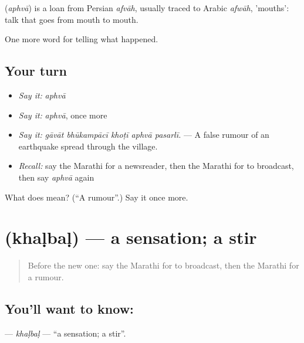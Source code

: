 \begin{cousinweb}
\textbf{} (\emph{aphvā}) is a loan from Persian \emph{afvāh}, usually traced to Arabic \emph{afwāh}, 'mouths': talk that goes from mouth to mouth.
\end{cousinweb}

\begin{grammarlens}[title={What you've built}]
One more word for telling what happened.
\end{grammarlens}

\subsection*{Your turn}
\begin{itemize}
\raggedright
  \item \emph{Say it:} \emph{aphvā}
  \item \emph{Say it:} \emph{aphvā}, once more
  \item \emph{Say it:} \emph{gāvāt bhūkampācī khoṭī aphvā pasarlī.} — A false rumour of an earthquake spread through the village.
  \item \emph{Recall:} say the Marathi for a newsreader, then the Marathi for to broadcast, then say \emph{aphvā} again
\end{itemize}

\begin{tcolorbox}[breakable,colback=teal!4,colframe=teal!35!black,title={Before you move on}]
What does  mean? (\textquotedblleft{}A rumour\textquotedblright{}.) Say it once more.
\end{tcolorbox}
\section[\texorpdfstring{\mr{खळबळ} (khaḷbaḷ)}{खळबळ (khaḷbaḷ)}]{ (khaḷbaḷ) — a sensation; a stir}

\label{lesson:MR-C313-khalbal}



\begin{quote}
Before the new one: say the Marathi for to broadcast, then the Marathi for a rumour.
\end{quote}

\subsection*{You'll want to know: }
\textbf{} — \emph{khaḷbaḷ} — \textquotedblleft{}a sensation; a stir\textquotedblright{}.


